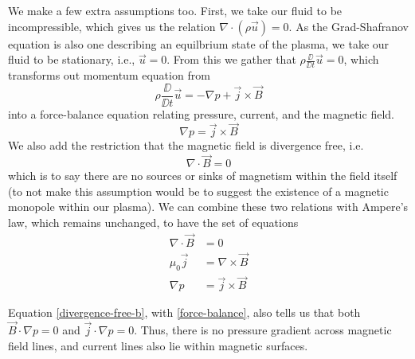 We make a few extra assumptions too. First, we take our fluid to be incompressible, which gives us the relation 
$\nabla \cdot (\rho \vec{u}) = 0$. As the Grad-Shafranov equation is also one describing an equilbrium state 
of the plasma, we take our fluid to be stationary, i.e., $\vec{u} = 0$. From this we gather 
that $\rho \frac{\DD}{\DD t} \vec{u} = 0$, which transforms out momentum equation from 
\begin{equation}
    \rho \frac{\DD}{\DD t} \vec{u} = -\nabla p + \vec{j} \times \vec{B}
\end{equation}
into a force-balance equation relating pressure, current, and the magnetic field.
\begin{equation}
    \nabla p = \vec{j} \times \vec{B}
\end{equation}
We also add the restriction that the magnetic field is divergence free, i.e.
\begin{equation}
    \nabla \cdot \vec{B} = 0
\end{equation}
which is to say there are no sources or sinks of magnetism within the field itself (to not make this 
assumption would be to suggest the existence of a magnetic monopole within our plasma). We can combine these 
two relations with Ampere's law, which remains unchanged, to have the set of equations
\begin{align}
    \label{divergence-free-b} \nabla \cdot \vec{B} &= 0 \\
    \label{local-amperes} \mu_0 \vec{j} &= \nabla \times \vec{B} \\
    \label{force-balance} \nabla p &= \vec{j} \times \vec{B}
\end{align} 

\begin{remark}
    Equation \ref{divergence-free-b}, with \ref{force-balance}, also tells us that both $\vec{B} \cdot \nabla p = 0$ and $\vec{j} \cdot \nabla p = 0$. 
    Thus, there is no pressure gradient across magnetic field lines, and current lines also lie within magnetic surfaces.
\end{remark}

